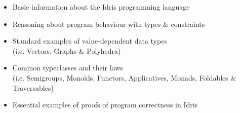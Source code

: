 \begin{itemize}
\item Basic information about the Idris programming language
\item Reasoning about program behaviour with types \& constraints
\item Standard examples of value-dependent data types \\
  \small
  (i.e. Vectors, Graphs \& Polyhedra)
  \normalsize
\item Common typeclasses and their laws \\
  \tiny
  (i.e. Semigroups, Monoids, Functors, Applicatives, Monads, Foldables \& Traversables)
  \normalsize
\item Essential examples of proofs of program correctness in Idris
\end{itemize}
